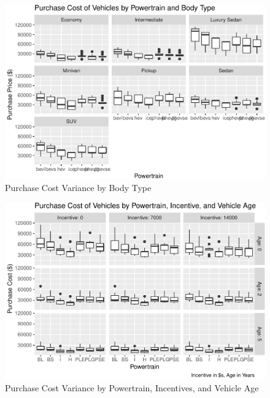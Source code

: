 \documentclass[]{elsarticle} %
\begin{document}
\begin{figure}

{\centering \includegraphics[width=1\linewidth]{Survey_Results_files/figure-latex/fig-boxplotPP-1} 

}

\caption{\label{fig-boxplotPP}Purchase Cost Variance by Body Type}\label{fig:fig-boxplotPP}
\end{figure}

\begin{figure}

{\centering \includegraphics[width=1\linewidth]{Survey_Results_files/figure-latex/fig-boxplot-PP-InctAge-1} 

}

\caption{\label{fig-boxplot-PP-InctAge}Purchase Cost Variance by Powertrain, Incentives, and Vehicle Age}\label{fig:fig-boxplot-PP-InctAge}
\end{figure}
\end{document}

